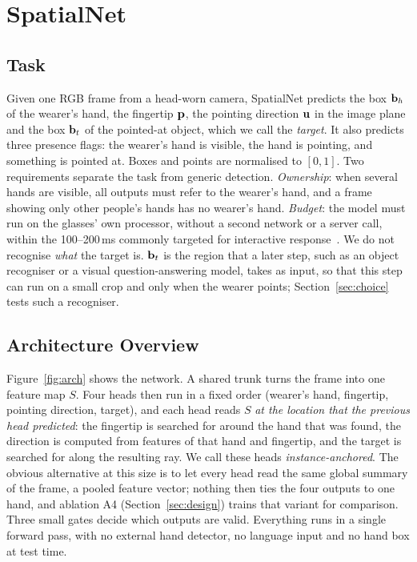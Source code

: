 \section{SpatialNet}\label{sec:method}

\subsection{Task}\label{sec:task}
Given one RGB frame from a head-worn camera, SpatialNet predicts the box $\mathbf{b}_h$ of the wearer's hand, the fingertip $\mathbf{p}$, the pointing direction $\mathbf{u}$ in the image plane and the box $\mathbf{b}_t$ of the pointed-at object, which we call the \emph{target}. It also predicts three presence flags: the wearer's hand is visible, the hand is pointing, and something is pointed at. Boxes and points are normalised to $[0,1]$. Two requirements separate the task from generic detection. \emph{Ownership}: when several hands are visible, all outputs must refer to the wearer's hand, and a frame showing only other people's hands has no wearer's hand. \emph{Budget}: the model must run on the glasses' own processor, without a second network or a server call, within the 100--200\,ms commonly targeted for interactive response~\cite{miller1968response,card1991information}. We do not recognise \emph{what} the target is. $\mathbf{b}_t$ is the region that a later step, such as an object recogniser or a visual question-answering model, takes as input, so that this step can run on a small crop and only when the wearer points; Section~\ref{sec:choice} tests such a recogniser.

\subsection{Architecture Overview}\label{sec:arch}
Figure~\ref{fig:arch} shows the network. A shared trunk turns the frame into one feature map $S$. Four heads then run in a fixed order (wearer's hand, fingertip, pointing direction, target), and each head reads $S$ \emph{at the location that the previous head predicted}: the fingertip is searched for around the hand that was found, the direction is computed from features of that hand and fingertip, and the target is searched for along the resulting ray. We call these heads \emph{instance-anchored}. The obvious alternative at this size is to let every head read the same global summary of the frame, a pooled feature vector; nothing then ties the four outputs to one hand, and ablation A4 (Section~\ref{sec:design}) trains that variant for comparison. Three small gates decide which outputs are valid. Everything runs in a single forward pass, with no external hand detector, no language input and no hand box at test time.

